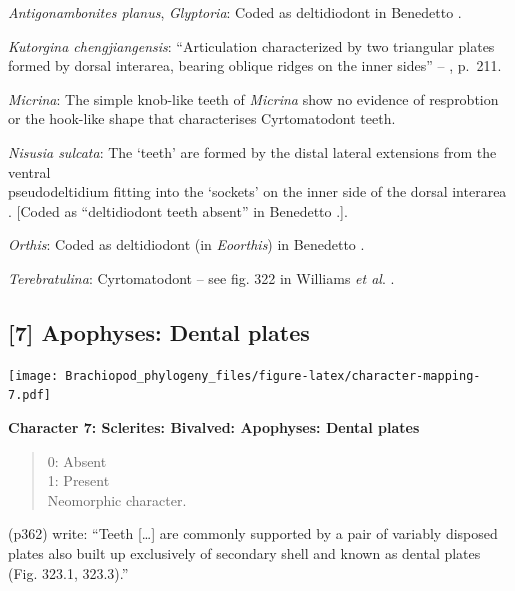 \documentclass[openany]{book}
\theoremstyle{definition}
\theoremstyle{definition}
\theoremstyle{definition}
\theoremstyle{remark}
\begin{document}
\hypertarget{Antigonambonites_planus-coding-6}{}
\emph{Antigonambonites planus}, \emph{Glyptoria}: Coded as deltidiodont
in Benedetto \citeyearpar{Benedetto2009iChaniella}.

\hypertarget{Kutorgina_chengjiangensis-coding-6}{}
\emph{Kutorgina chengjiangensis}: ``Articulation characterized by two
triangular plates formed by dorsal interarea, bearing oblique ridges on
the inner sides'' -- \citet{Williams2000LinguliformeaCraniiformea},
p.~211.

\hypertarget{Micrina-coding-6}{}
\emph{Micrina}: The simple knob-like teeth of \emph{Micrina} show no
evidence of resprobtion or the hook-like shape that characterises
Cyrtomatodont teeth.

\hypertarget{Nisusia_sulcata-coding-6}{}
\emph{Nisusia sulcata}: The `teeth' are formed by the distal lateral
extensions from the ventral\\
pseudodeltidium fitting into the `sockets' on the inner side of the
dorsal interarea \citep{Holmer2018Evolutionarysignificance}. {[}Coded as
``deltidiodont teeth absent'' in Benedetto
\citeyearpar{Benedetto2009iChaniella}.{]}.

\hypertarget{Orthis-coding-6}{}
\emph{Orthis}: Coded as deltidiodont (in \emph{Eoorthis}) in Benedetto
\citeyearpar{Benedetto2009iChaniella}.

\hypertarget{Terebratulina-coding-6}{}
\emph{Terebratulina}: Cyrtomatodont -- see fig. 322 in Williams \emph{et
al}. \citeyearpar{Williams2000LinguliformeaCraniiformea}.

\subsection*{{[}7{]} Apophyses: Dental
plates}\label{apophyses-dental-plates}

\texttt{[image: Brachiopod\_phylogeny\_files/figure-latex/character-mapping-7.pdf]}

\textbf{Character 7: Sclerites: Bivalved: Apophyses: Dental plates}

\begin{quote}
0: Absent\\
1: Present\\
Neomorphic character.
\end{quote}

\citet{Williams1997Introduction} (p362) write: ``Teeth {[}\ldots{}{]}
are commonly supported by a pair of variably disposed plates also built
up exclusively of secondary shell and known as dental plates (Fig.
323.1, 323.3).''
\end{document}

